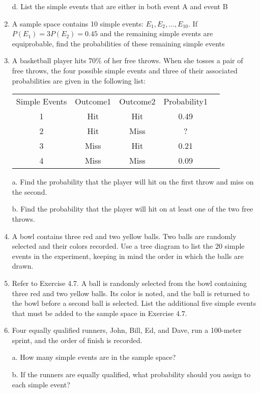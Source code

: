 \documentclass{article}
\begin{document}
\begin{enumerate}
    d. List the simple events that are either in both event A and event B
    
    \item A sample space contains 10 simple events: $E_1, E_2,...,E_10$. If $P(E_1) = 3P(E_2) = 0.45$ and the remaining simple events are equiprobable, find the probabilities of these remaining simple events
    \item A basketball player hits 70\% of her free throws. When she tosses a pair of free throws, the four possible simple events and three of their associated probabilities are given in the following list:
    
    \begin{center}
    \begin{tabular}{|c|c|c|c|c|}
        \hline
        Simple Events & Outcome1 & Outcome2 & Probability1 \\
        1 & Hit & Hit & 0.49 \\
        2 & Hit & Miss & ? \\
        3 & Miss & Hit & 0.21 \\
        4 & Miss & Miss & 0.09 \\
        \hline
    \end{tabular}
\end{center}
a. Find the probability that the player will hit on the first throw and miss on the second.

b. Find the probability that the player will hit on at least one of the two free throws.

\item A bowl contains three red and two yellow balls. Two balls are randomly selected and their colors recorded. Use a tree diagram to list the 20 simple events in the experiment, keeping in mind the order in which the balls are drawn.

\item Refer to Exercise 4.7. A ball is randomly selected from the bowl containing three red and two yellow balls. Its color is noted, and the ball is returned to the bowl before a second ball is selected. List the additional five simple events that must be added to the sample space in Exercise 4.7.


\item Four equally qualified runners, John, Bill, Ed, and Dave, run a 100-meter sprint, and the order of finish is recorded.

a. How many simple events are in the sample space?

b. If the runners are equally qualified, what probability should you assign to each simple event?


\end{enumerate}
\end{document}
